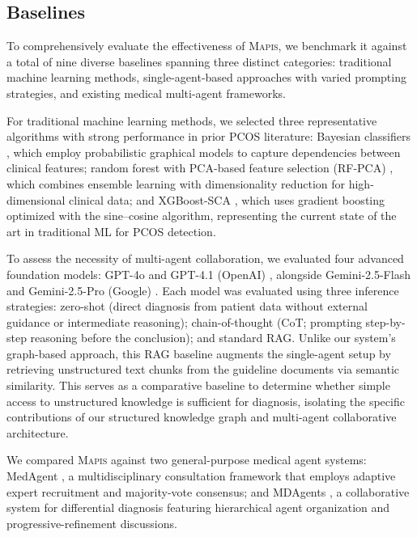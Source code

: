 \documentclass[a4paper,fleqn]{cas-dc}
\begin{document}
\subsection{Baselines} 
To comprehensively evaluate the effectiveness of \textsc{Mapis}, we benchmark it against a total of nine diverse baselines spanning three distinct categories: traditional machine learning methods, single-agent-based approaches with varied prompting strategies, and existing medical multi-agent frameworks.

For traditional machine learning methods, we selected three representative algorithms with strong performance in prior PCOS literature: Bayesian classifiers \cite{ACritical}, which employ probabilistic graphical models to capture dependencies between clinical features; random forest with PCA-based feature selection (RF-PCA) \cite{i-HOPE}, which combines ensemble learning with dimensionality reduction for high-dimensional clinical data; and XGBoost-SCA \cite{Sinecosine}, which uses gradient boosting optimized with the sine–cosine algorithm, representing the current state of the art in traditional ML for PCOS detection.

To assess the necessity of multi-agent collaboration, we evaluated four advanced foundation models: GPT-4o and GPT-4.1 (OpenAI) \cite{hurst2024gpt}, alongside Gemini-2.5-Flash and Gemini-2.5-Pro (Google) \cite{comanici2025gemini}. Each model was evaluated using three inference strategies: zero-shot (direct diagnosis from patient data without external guidance or intermediate reasoning); chain-of-thought (CoT; prompting step-by-step reasoning before the conclusion); and standard RAG. Unlike our system's graph-based approach, this RAG baseline augments the single-agent setup by retrieving unstructured text chunks from the guideline documents via semantic similarity. This serves as a comparative baseline to determine whether simple access to unstructured knowledge is sufficient for diagnosis, isolating the specific contributions of our structured knowledge graph and multi-agent collaborative architecture. 

We compared \textsc{Mapis} against two general-purpose medical agent systems: MedAgent \cite{tang-etal-2024-medagents}, a multidisciplinary consultation framework that employs adaptive expert recruitment and majority-vote consensus; and MDAgents \cite{kim2024mdagents}, a collaborative system for differential diagnosis featuring hierarchical agent organization and progressive-refinement discussions.
\end{document}
